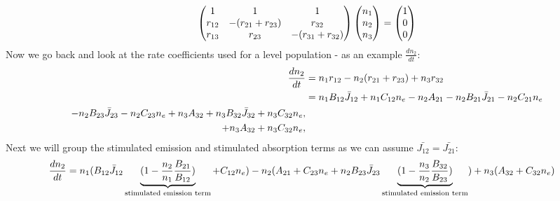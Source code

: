 \documentclass[letterpaper,10pt,english]{sphinxmanual}
\begin{document}
\begin{gather}
\begin{split}\left(\begin{matrix}
    1 & 1 & 1\\
    r_{12} & -(r_{21} + r_{23}) & r_{32}\\
    r_{13} & r_{23} & -(r_{31} + r_{32}) \\
\end{matrix}\right)
\left(
\begin{matrix}
    n_1\\
    n_2\\
    n_3\\
\end{matrix}
\right)
=
\left(
\begin{matrix}
    1\\
    0\\
    0\\
\end{matrix}
\right)\end{split}\notag
\end{gather}
Now we go back and look at the rate coefficients used for a level population - as an example $\frac{dn_2}{dt}$:
\begin{gather}
\begin{split}\frac{dn_2}{dt} &= n_1 r_{12} - n_2 (r_{21} + r_{23}) + n_3 r_{32}\\
            &= n_1 B_{12} \bar{J}_{12} + n_1 C_{12} n_e - n_2 A_{21} - n_2 B_{21} \bar{J}_{21} - n_2 C_{21} n_e\\
                    - n_2 B_{23} \bar{J}_{23} - n_2 C_{23} n_e + n_3 A_{32} + n_3 B_{32} \bar{J}_{32} + n_3 C_{32} n_e,\\
                     + n_3 A_{32}  + n_3 C_{32} n_e,\end{split}\notag
\end{gather}
Next we will group the stimulated emission and stimulated absorption terms as we can assume $\bar{J_{12}} = \bar{J_{21}}$:
\begin{gather}
\begin{split}\frac{dn_2}{dt} &= n_1 (B_{12} \bar{J}_{12} \underbrace{(1 - \frac{n_2}{n_1}\frac{B_{21}}{B_{12}})}_\textrm{stimulated emission term} + C_{12} n_e)
                - n_2 (A_{21} + C_{23} n_e + n_2 B_{23} \bar{J}_{23} \underbrace{(1 - \frac{n_3}{n_2}\frac{B_{32}}{B_{23}})}_\textrm{stimulated emission term})
                + n_3 (A_{32} + C_{32} n_e)\end{split}\notag
\end{gather}
\end{document}
